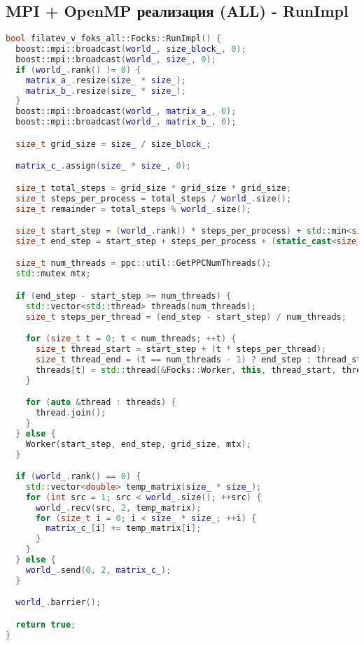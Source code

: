 \documentclass[12pt]{article}
\begin{document}
\subsection{MPI + OpenMP реализация (ALL) - RunImpl}
\begin{lstlisting}[language=C++]
bool filatev_v_foks_all::Focks::RunImpl() {
  boost::mpi::broadcast(world_, size_block_, 0);
  boost::mpi::broadcast(world_, size_, 0);
  if (world_.rank() != 0) {
    matrix_a_.resize(size_ * size_);
    matrix_b_.resize(size_ * size_);
  }
  boost::mpi::broadcast(world_, matrix_a_, 0);
  boost::mpi::broadcast(world_, matrix_b_, 0);

  size_t grid_size = size_ / size_block_;

  matrix_c_.assign(size_ * size_, 0);

  size_t total_steps = grid_size * grid_size * grid_size;
  size_t steps_per_process = total_steps / world_.size();
  size_t remainder = total_steps % world_.size();

  size_t start_step = (world_.rank() * steps_per_process) + std::min<size_t>(world_.rank(), remainder);
  size_t end_step = start_step + steps_per_process + (static_cast<size_t>(world_.rank()) < remainder ? 1 : 0);

  size_t num_threads = ppc::util::GetPPCNumThreads();
  std::mutex mtx;

  if (end_step - start_step >= num_threads) {
    std::vector<std::thread> threads(num_threads);
    size_t steps_per_thread = (end_step - start_step) / num_threads;

    for (size_t t = 0; t < num_threads; ++t) {
      size_t thread_start = start_step + (t * steps_per_thread);
      size_t thread_end = (t == num_threads - 1) ? end_step : thread_start + steps_per_thread;
      threads[t] = std::thread(&Focks::Worker, this, thread_start, thread_end, grid_size, std::ref(mtx));
    }

    for (auto &thread : threads) {
      thread.join();
    }
  } else {
    Worker(start_step, end_step, grid_size, mtx);
  }

  if (world_.rank() == 0) {
    std::vector<double> temp_matrix(size_ * size_);
    for (int src = 1; src < world_.size(); ++src) {
      world_.recv(src, 2, temp_matrix);
      for (size_t i = 0; i < size_ * size_; ++i) {
        matrix_c_[i] += temp_matrix[i];
      }
    }
  } else {
    world_.send(0, 2, matrix_c_);
  }

  world_.barrier();

  return true;
}
\end{lstlisting}
\end{document}
